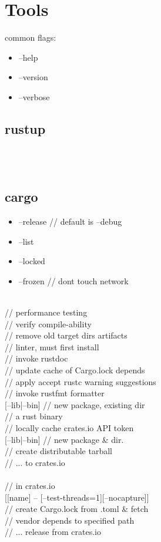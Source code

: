 \section{Tools}
common flags:
\begin{itemize}[label={}]
    \item --help
    \item --version
    \item --verbose
\end{itemize}
\subsection*{rustup}
\\
 \\
\subsection*{cargo}
\begin{itemize}[label={}]
    \item --release // default is --debug
    \item --list
    \item --locked
    \item --frozen // don\textquotesingle t touch network
\end{itemize}
 \\
 // performance testing \\
 // verify compile-ability \\
 // remove old target dir\textquotesingle s artifacts \\
 // linter, must first install \\
 // invoke rustdoc \\
 // update cache of Cargo.lock depend\textquotesingle s \\
 // apply accept rustc warning suggestions \\
 // invoke rustfmt formatter \\ 
 [--lib|--bin] // new package, existing dir \\[0pt]
 // a rust binary \\
 // locally cache crates.io API token \\
 [--lib|--bin] // new package \& dir. \\
 // create distributable tarball \\
 // ... to crates.io \\
 \\
 // in crates.io \\
 [[name] -- [--test-threads=1][--nocapture]] \\
 // create Cargo.lock from .toml \& fetch \\
 // vendor depend\textquotesingle s to specified path\\
 // ... release from crates.io \\

